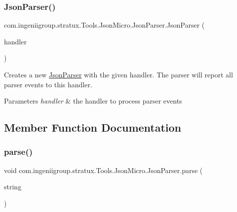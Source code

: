 \subsubsection{\texorpdfstring{Json\+Parser()}{JsonParser()}}
{\footnotesize\ttfamily com.\+ingeniigroup.\+stratux.\+Tools.\+Json\+Micro.\+Json\+Parser.\+Json\+Parser (\begin{DoxyParamCaption}\item[{\hyperlink{classcom_1_1ingeniigroup_1_1stratux_1_1_tools_1_1_json_micro_1_1_json_handler}{Json\+Handler}$<$?, ?$>$}]{handler }\end{DoxyParamCaption})}

Creates a new \hyperlink{classcom_1_1ingeniigroup_1_1stratux_1_1_tools_1_1_json_micro_1_1_json_parser}{Json\+Parser} with the given handler. The parser will report all parser events to this handler.


\begin{DoxyParams}{Parameters}
{\em handler} & the handler to process parser events \\
\hline
\end{DoxyParams}


\subsection{Member Function Documentation}
\mbox{\label{classcom_1_1ingeniigroup_1_1stratux_1_1_tools_1_1_json_micro_1_1_json_parser_a641caf8fbf7c1f870c1bad17681a2b53}} 
\subsubsection{\texorpdfstring{parse()}{parse()}\hspace{0.1cm}{\footnotesize\ttfamily [1/3]}}
{\footnotesize\ttfamily void com.\+ingeniigroup.\+stratux.\+Tools.\+Json\+Micro.\+Json\+Parser.\+parse (\begin{DoxyParamCaption}\item[{String}]{string }\end{DoxyParamCaption})}

